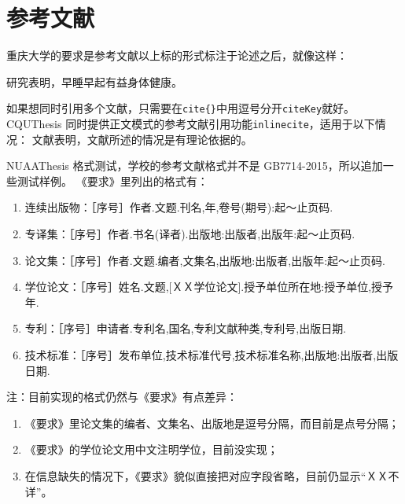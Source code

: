 \section{参考文献}
\label{sec:bib}
重庆大学的要求是参考文献以上标的形式标注于论述之后，就像这样：

研究表明\cite{r1}，早睡早起有益身体健康。

如果想同时引用多个文献\cite{r2,r3,r4,r6}，只需要在\verb|cite{}|中用逗号分开\texttt{citeKey}就好。
CQUThesis 同时提供正文模式的参考文献引用功能\texttt{inlinecite}，适用于以下情况：
文献表明，文献所述的情况是有理论依据的。

NUAAThesis 格式测试，学校的参考文献格式并不是 GB7714-2015，所以追加一些测试样例。
《要求》里列出的格式有：
\begin{enumerate}
  \item 连续出版物\cite{n11,n12}：［序号］作者.文题.刊名,年,卷号(期号):起～止页码.
  \item 专译集\cite{n21,n22}：［序号］作者.书名(译者).出版地:出版者,出版年:起～止页码.
  \item 论文集\cite{n31,n32}：［序号］作者.文题.编者,文集名,出版地:出版者,出版年:起～止页码.
  \item 学位论文\cite{n41,n42,n43}：［序号］姓名.文题,[ＸＸ学位论文].授予单位所在地:授予单位,授予年.
  \item 专利\cite{n51,n52,n53}：［序号］申请者.专利名,国名,专利文献种类,专利号,出版日期.
  \item 技术标准\cite{n61,n62,n63}：［序号］发布单位,技术标准代号,技术标准名称,出版地:出版者,出版日期.
\end{enumerate}

注：目前实现的格式仍然与《要求》有点差异：
\begin{enumerate}
  \item 《要求》里论文集的编者、文集名、出版地是逗号分隔，而目前是点号分隔；
  \item 《要求》的学位论文用中文注明学位，目前没实现；
  \item 在信息缺失的情况下，《要求》貌似直接把对应字段省略，目前仍显示“ＸＸ不详”。
\end{enumerate}
